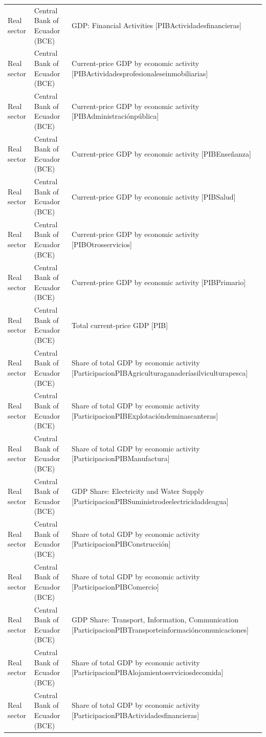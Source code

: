 \documentclass[10pt,a4paper]{article}
\begin{document}
\begin{longtable}{@{}>{\raggedright\arraybackslash}p{3.5cm}>{\raggedright\arraybackslash}p{5.6cm}>{\raggedright\arraybackslash}p{\dimexpr\textwidth-9.1cm-4\tabcolsep\relax}@{}}
Real sector & Central Bank of Ecuador (BCE) & GDP: Financial Activities [PIBActividadesfinancieras]\\
Real sector & Central Bank of Ecuador (BCE) & Current-price GDP by economic activity [PIBActividadesprofesionaleseinmobiliarias]\\
Real sector & Central Bank of Ecuador (BCE) & Current-price GDP by economic activity [PIBAdministraci\'{o}np\'{u}blica]\\
Real sector & Central Bank of Ecuador (BCE) & Current-price GDP by economic activity [PIBEnse\~{n}anza]\\
Real sector & Central Bank of Ecuador (BCE) & Current-price GDP by economic activity [PIBSalud]\\
Real sector & Central Bank of Ecuador (BCE) & Current-price GDP by economic activity [PIBOtrosservicios]\\
Real sector & Central Bank of Ecuador (BCE) & Current-price GDP by economic activity [PIBPrimario]\\
Real sector & Central Bank of Ecuador (BCE) & Total current-price GDP [PIB]\\
Real sector & Central Bank of Ecuador (BCE) & Share of total GDP by economic activity [ParticipacionPIBAgriculturaganader\'{i}asilviculturapesca]\\
Real sector & Central Bank of Ecuador (BCE) & Share of total GDP by economic activity [ParticipacionPIBExplotaci\'{o}ndeminascanteras]\\
Real sector & Central Bank of Ecuador (BCE) & Share of total GDP by economic activity [ParticipacionPIBManufactura]\\
Real sector & Central Bank of Ecuador (BCE) & GDP Share: Electricity and Water Supply [ParticipacionPIBSuministrodeelectricidaddeagua]\\
Real sector & Central Bank of Ecuador (BCE) & Share of total GDP by economic activity [ParticipacionPIBConstrucci\'{o}n]\\
Real sector & Central Bank of Ecuador (BCE) & Share of total GDP by economic activity [ParticipacionPIBComercio]\\
Real sector & Central Bank of Ecuador (BCE) & GDP Share: Transport, Information, Communication [ParticipacionPIBTransporteinformaci\'{o}ncomunicaciones]\\
Real sector & Central Bank of Ecuador (BCE) & Share of total GDP by economic activity [ParticipacionPIBAlojamientoserviciosdecomida]\\
Real sector & Central Bank of Ecuador (BCE) & Share of total GDP by economic activity [ParticipacionPIBActividadesfinancieras]\\

\end{longtable}
\end{document}
